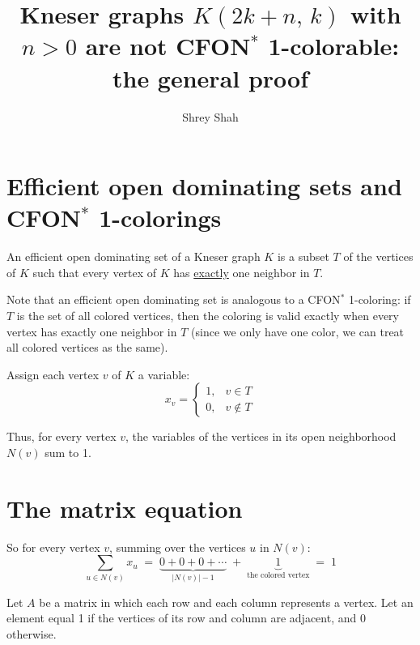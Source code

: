 \documentclass[11pt]{article}
\title{Kneser graphs $K(2k+n,\,k)$ with $n>0$ are not CFON$^{*}$ 1-colorable:\\[2pt]
       the general proof}
\author{Shrey Shah}
\date{}
\begin{document}
\maketitle

\section{Efficient open dominating sets and CFON$^{*}$ 1-colorings}

An efficient open dominating set of a Kneser graph $K$ is a subset $T$ of the
vertices of $K$ such that every vertex of $K$ has \underline{exactly} one
neighbor in $T$.

Note that an efficient open dominating set is analogous to a CFON$^{*}$
1-coloring: if $T$ is the set of all colored vertices, then the coloring is
valid exactly when every vertex has exactly one neighbor in $T$ (since we only
have one color, we can treat all colored vertices as the same).

Assign each vertex $v$ of $K$ a variable:
\[
  x_v =
  \begin{cases}
    1, & v \in T\\
    0, & v \notin T
  \end{cases}
\]

Thus, for every vertex $v$, the variables of the vertices in its open
neighborhood $N(v)$ sum to 1.

\section{The matrix equation}

So for every vertex $v$, summing over the vertices $u$ in $N(v)$:
\[
  \sum_{u \in N(v)} x_u
  \;=\; \underbrace{0 + 0 + 0 + \cdots}_{|N(v)|-1}
  \;+\; \underbrace{1}_{\text{the colored vertex}}
  \;=\; 1
\]

Let $A$ be a matrix in which each row and each column represents a vertex. Let
an element equal 1 if the vertices of its row and column are adjacent, and 0
otherwise.
\end{document}
